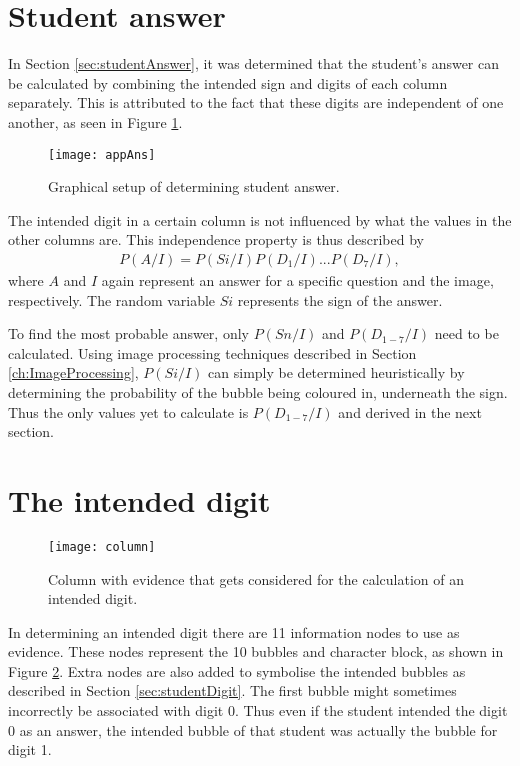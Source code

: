 \section{Student answer}
In Section \ref{sec:studentAnswer}, it was determined that the student's answer can be calculated by combining the intended sign and digits of each column separately. This is attributed to the fact that these digits are independent of one another, as seen in Figure \ref{fig:appAns}. 

\begin{figure}
  \centering
  \texttt{[image: appAns]}\\
  \caption{Graphical setup of determining student answer.}
  \label{fig:appAns}
\end{figure}
The intended digit in a certain column is not influenced by what the values in the other columns are. This independence property is thus described by\begin{align}
  P(A/I) =  P(Si/I)P(D_1/I)...P(D_7/I),
\label{eqn:ansIndep}
\end{align}
where $A$ and $I$ again represent an answer  for a specific question and the image, respectively. The random variable $Si$ represents the sign of the answer.

To find the most probable answer, only $P(Sn/I)$ and $P(D_{1-7}/I)$ need to be calculated. Using image processing techniques described in Section \ref{ch:ImageProcessing}, $P(Si/I)$ can simply be determined heuristically by determining the probability of the bubble being coloured in, underneath the sign. Thus the only values yet to calculate is $P(D_{1-7}/I)$ and derived in the next section.

\section{The intended digit}

\begin{figure}
  \centering
  \texttt{[image: column]}\\
  \caption{Column with evidence that gets considered for the calculation of an intended digit.}
  \label{fig:column}
\end{figure}

In determining an intended digit there are 11 information nodes to use as evidence. These nodes represent the 10 bubbles and character block, as shown in Figure \ref{fig:column}. Extra nodes are also added to symbolise the intended bubbles as described in Section \ref{sec:studentDigit}. The first bubble might sometimes incorrectly be associated with digit 0. Thus even if the student intended the digit 0 as an answer, the intended bubble of that student was actually the bubble for digit 1.

